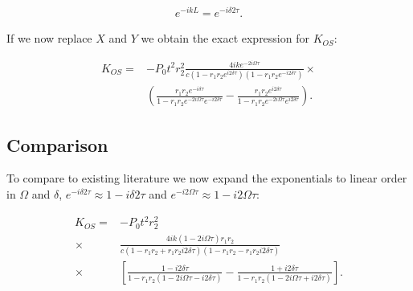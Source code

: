 \begin{align}
e^{-ikL}=e^{-i\delta 2\tau}.%
\end{align}


If we now replace $X$ and $Y$ we obtain the exact expression for $K_{OS}$:%

\begin{align}
K_{OS}=&-P_0 t^2 r_2^2 \frac{4ike^{-2i\Omega\tau}}{c(1-r_1\!r_2e^{i2\delta\tau})(1-r_1\!r_2e^{-i2\delta\tau})}\times\nonumber\\
 & \left( \frac{r_1\!r_2e^{-i\delta \tau}}{1\!-\!r_1\!r_2e^{-2i\Omega\tau} e^{-i2\delta\tau}}
 \!-\!\frac{r_1\!r_2e^{i2\delta\tau}}{1\!-\!r_1\!r_2e^{-2i\Omega\tau}e^{i2\delta\tau}} \right). 
\end{align}

\subsection{Comparison}

To compare to existing literature we now expand the exponentials to linear order 
in $\Omega$ and $\delta$, 
$e^{-i\delta 2\tau}\approx 1-i\delta 2\tau$
and $e^{-i2\Omega \tau}\approx 1-i2\Omega \tau$:

\begin{align}
K_{OS} =& - P_0 t^2 r_2^2 \nonumber \\ 
 \times  &\frac{4ik(1-2i\Omega\tau)r_1r_2}{c(1-r_1r_2+r_1r_2i2\delta\tau)(1-r_1r_2-r_1r_2i2\delta\tau)}\nonumber\\
 \times  &\left[\frac{1-i2\delta\tau}{1-r_1r_2(1-2i\Omega\tau-i2\delta\tau)} \nonumber
- \frac{1+i2\delta\tau}{1-r_1r_2(1-2i\Omega\tau+i2\delta\tau)} \right]. 
\end{align}


